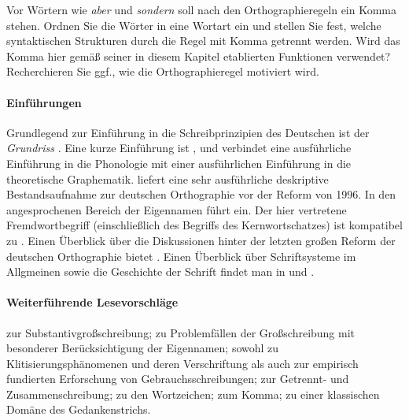 \Uebung[\tristar] \label{u154} Vor Wörtern wie \textit{aber} und \textit{sondern} soll nach den Orthographieregeln ein Komma stehen.
Ordnen Sie die Wörter in eine Wortart ein und stellen Sie fest, welche syntaktischen Strukturen durch die Regel mit Komma getrennt werden.
Wird das Komma hier gemäß seiner in diesem Kapitel etablierten Funktionen verwendet?
Recherchieren Sie ggf., wie die Orthographieregel motiviert wird.

\WeitereLiteratur

\paragraph*{Einführungen}

\begin{sloppypar}

Grundlegend zur Einführung in die Schreibprinzipien des Deutschen ist der \textit{Grundriss} \citep[Kapitel~8]{Eisenberg1}.
Eine kurze Einführung ist \citet{Fuhrhop2009}, und \citet{FuhrhopPeters2013} verbindet eine ausführliche Einführung in die Phonologie mit einer ausführlichen Einführung in die theoretische Graphematik.
\citet{Maas1992} liefert eine sehr ausführliche deskriptive Bestandsaufnahme zur deutschen Orthographie vor der Reform von 1996. 
In den angesprochenen Bereich der Eigennamen führt \citet{NueblingEa2012} ein.
Der hier vertretene Fremdwortbegriff (einschließlich des Begriffs des Kernwortschatzes) ist kompatibel zu \citet{Eisenberg2012}.
Einen Überblick über die Diskussionen hinter der letzten großen Reform der deutschen Orthographie bietet \citet{AugstEa1997}.
Einen Überblick über Schriftsysteme im Allgmeinen sowie die Geschichte der Schrift findet man in \citet{Duerscheid2012a} und \citet{Coulmas1989}.

\paragraph*{Weiterführende Lesevorschläge}
\citet{Gallmann1995} zur Substantivgroßschreibung;
\citet{Eisenberg1981} zu Problemfällen der Großschreibung mit besonderer Berücksichtigung der Eigennamen;
\citet{SchaeferSayatz2014} sowohl zu Klitisierungsphänomenen und deren Verschriftung als auch zur empirisch fundierten Erforschung von Gebrauchsschreibungen;
\citet{Jacobs2005} zur Getrennt- und Zusammenschreibung;
\citet{Buchmann2015} zu den Wortzeichen;
\citet{Primus1993} zum Komma;
\citet{Primus2008} zu einer klassischen Domäne des Gedankenstrichs.
\end{sloppypar}
